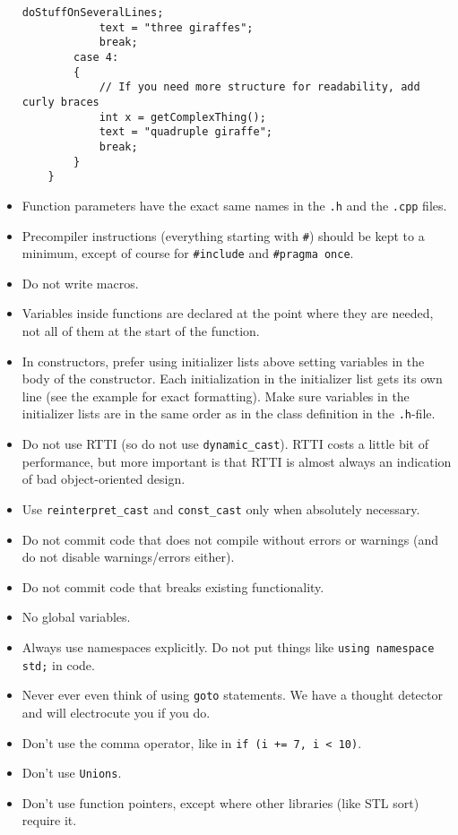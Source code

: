 \documentclass{article}
\begin{document}
\begin{itemize}
\begin{Verbatim}[fontsize=\small]
            doStuffOnSeveralLines;
            text = "three giraffes";
            break;
        case 4:
        {
            // If you need more structure for readability, add curly braces
            int x = getComplexThing();
            text = "quadruple giraffe";
            break;
        }
    }
    \end{Verbatim}
    \item Function parameters have the exact same names in the \texttt{.h} and the \texttt{.cpp} files.
    \item Precompiler instructions (everything starting with \texttt{\#}) should be kept to a minimum, except of course for \texttt{\#include} and \texttt{\#pragma once}.
    \item Do not write macros.
    \item Variables inside functions are declared at the point where they are needed, not all of them at the start of the function.
    \item In constructors, prefer using initializer lists above setting variables in the body of the constructor. Each initialization in the initializer list gets its own line (see the example for exact formatting). Make sure variables in the initializer lists are in the same order as in the class definition in the \texttt{.h}-file.
    \item Do not use RTTI (so do not use \texttt{dynamic\_cast}). RTTI costs a little bit of performance, but more important is that RTTI is almost always an indication of bad object-oriented design.
    \item Use \texttt{reinterpret\_cast} and \texttt{const\_cast} only when absolutely necessary.
    \item Do not commit code that does not compile without errors or warnings (and do not disable warnings/errors either).
    \item Do not commit code that breaks existing functionality.
    \item No global variables.
    \item Always use namespaces explicitly. Do not put things like \texttt{using namespace std;} in code.
    \item Never ever even think of using \texttt{goto} statements. We have a thought detector and will electrocute you if you do.
    \item Don't use the comma operator, like in \texttt{if (i += 7, i < 10)}.
    \item Don't use \texttt{Unions}.
    \item Don't use function pointers, except where other libraries (like STL sort) require it.

\end{itemize}
\end{document}
